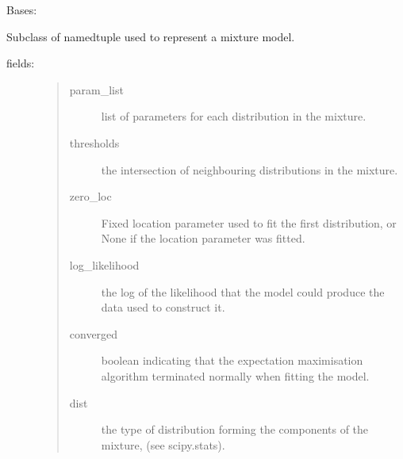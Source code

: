 \documentclass[letterpaper,10pt,english]{sphinxmanual}
\begin{document}

\begin{fulllineitems}
\label{\detokenize{tes:tes.analysis.MixtureModel}}
\sphinxAtStartPar
Bases: {\hyperref[\detokenize{tes:tes.analysis.MixtureModel}]{}}

\sphinxAtStartPar
Subclass of namedtuple used to represent a mixture model.
\begin{description}
\item[{fields:}] \leavevmode\begin{quote}\begin{description}
\item[{param\_list}] \leavevmode
\sphinxAtStartPar
list of parameters for each distribution in the mixture.

\item[{thresholds}] \leavevmode
\sphinxAtStartPar
the intersection of neighbouring distributions in the
mixture.

\item[{zero\_loc}] \leavevmode
\sphinxAtStartPar
Fixed location parameter used to fit the first distribution,
or None if the location parameter was fitted.

\item[{log\_likelihood}] \leavevmode
\sphinxAtStartPar
the log of the likelihood that the model could produce
the data used to construct it.

\item[{converged}] \leavevmode
\sphinxAtStartPar
boolean indicating that the expectation maximisation
algorithm terminated normally when fitting the model.

\item[{dist}] \leavevmode
\sphinxAtStartPar
the type of distribution forming the components of the mixture,
(see scipy.stats).

\end{description}\end{quote}

\end{description}


\end{fulllineitems}
\end{document}
